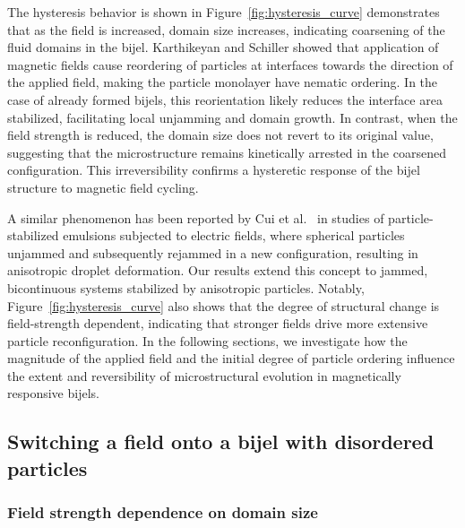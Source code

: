 The hysteresis behavior is shown in Figure~\ref{fig:hysteresis_curve} demonstrates that as the field is increased, domain size increases, indicating coarsening 
of the fluid domains in the bijel. Karthikeyan and Schiller showed that application of magnetic fields cause reordering of particles at interfaces towards the
direction of the applied field, making the particle monolayer have nematic ordering. In the case of already formed bijels,
this reorientation likely reduces the interface area stabilized, facilitating local unjamming and domain growth. In contrast, when the field strength is reduced, 
the domain size does not revert to its original value, suggesting that the microstructure remains kinetically arrested in the coarsened configuration. This 
irreversibility confirms a hysteretic response of the bijel structure to magnetic field cycling.

A similar phenomenon has been reported by Cui et al.~\cite{cui_stabilizing_2013} in studies of particle-stabilized emulsions subjected to electric fields, 
where spherical particles unjammed and subsequently rejammed in a new configuration, resulting in anisotropic droplet deformation. Our results extend this 
concept to jammed, bicontinuous systems stabilized by anisotropic particles. Notably, Figure~\ref{fig:hysteresis_curve} also shows that the degree of 
structural change is field-strength dependent, indicating that stronger fields drive more extensive particle reconfiguration. In the following sections, 
we investigate how the magnitude of the applied field and the initial degree of particle ordering influence the extent and reversibility of microstructural 
evolution in magnetically responsive bijels.

\subsection{Switching a field onto a bijel with disordered particles}
\subsubsection{Field strength dependence on domain size}
\label{section:field-strength-dependence-on-domain-size}

